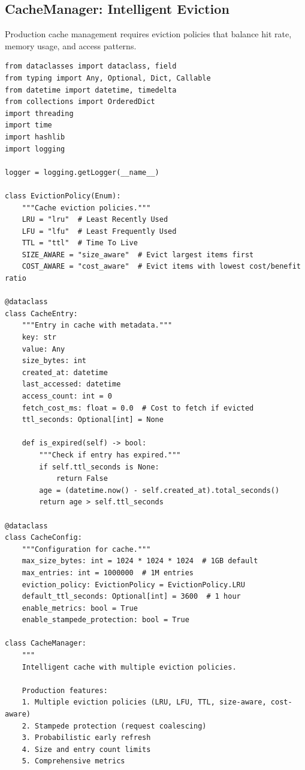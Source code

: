 \subsection{CacheManager: Intelligent Eviction}

Production cache management requires eviction policies that balance hit rate, memory usage, and access patterns.

\begin{lstlisting}[style=python, caption={Cache Manager with Intelligent Eviction}]
from dataclasses import dataclass, field
from typing import Any, Optional, Dict, Callable
from datetime import datetime, timedelta
from collections import OrderedDict
import threading
import time
import hashlib
import logging

logger = logging.getLogger(__name__)

class EvictionPolicy(Enum):
    """Cache eviction policies."""
    LRU = "lru"  # Least Recently Used
    LFU = "lfu"  # Least Frequently Used
    TTL = "ttl"  # Time To Live
    SIZE_AWARE = "size_aware"  # Evict largest items first
    COST_AWARE = "cost_aware"  # Evict items with lowest cost/benefit ratio

@dataclass
class CacheEntry:
    """Entry in cache with metadata."""
    key: str
    value: Any
    size_bytes: int
    created_at: datetime
    last_accessed: datetime
    access_count: int = 0
    fetch_cost_ms: float = 0.0  # Cost to fetch if evicted
    ttl_seconds: Optional[int] = None

    def is_expired(self) -> bool:
        """Check if entry has expired."""
        if self.ttl_seconds is None:
            return False
        age = (datetime.now() - self.created_at).total_seconds()
        return age > self.ttl_seconds

@dataclass
class CacheConfig:
    """Configuration for cache."""
    max_size_bytes: int = 1024 * 1024 * 1024  # 1GB default
    max_entries: int = 1000000  # 1M entries
    eviction_policy: EvictionPolicy = EvictionPolicy.LRU
    default_ttl_seconds: Optional[int] = 3600  # 1 hour
    enable_metrics: bool = True
    enable_stampede_protection: bool = True

class CacheManager:
    """
    Intelligent cache with multiple eviction policies.

    Production features:
    1. Multiple eviction policies (LRU, LFU, TTL, size-aware, cost-aware)
    2. Stampede protection (request coalescing)
    3. Probabilistic early refresh
    4. Size and entry count limits
    5. Comprehensive metrics


\end{lstlisting}
